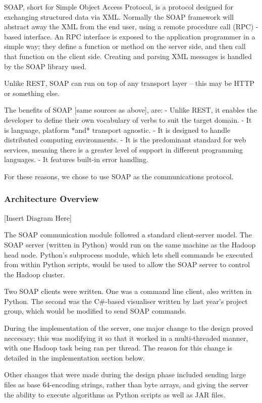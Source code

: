 SOAP, short for Simple Object Access Protocol, is a protocol designed for exchanging structured data via XML. Normally the SOAP framework will abstract away the XML from the end user, using a remote procedure call (RPC) -based interface. An RPC interface is exposed to the application programmer in a simple way; they define a function or method on the server side, and then call that function on the client side. Creating and parsing XML messages is handled by the SOAP library used.

Unlike REST, SOAP can run on top of any transport layer -- this may be HTTP or something else.

The benefits of SOAP [same sources as above], are:
- Unlike REST, it enables the developer to define their own vocabulary of verbs to suit the target domain.
- It is language, platform *and* transport agnostic.
- It is designed to handle distributed computing environments.
- It is the predominant standard for web services, meaning there is a greater level of support in different programming languages.
- It features built-in error handling.

For these reasons, we chose to use SOAP as the communications protocol.

\subsubsection{Architecture Overview}

[Insert Diagram Here]

The SOAP communication module followed a standard client-server model. The SOAP server (written in Python) would run on the same machine as the Hadoop head node. Python's subprocess module, which lets shell commands be executed from within Python scripts, would be used to allow the SOAP server to control the Hadoop cluster.

Two SOAP clients were written. One was a command line client, also written in Python. The second was the C#-based visualiser written by last year's project group, which would be modified to send SOAP commands.

During the implementation of the server, one major change to the design proved neccesary; this was modifying it so that it worked in a multi-threaded manner, with one Hadoop task being ran per thread. The reason for this change is detailed in the implementation section below.

Other changes that were made during the design phase included sending large files as base 64-encoding strings, rather than byte arrays, and giving the server the ability to execute algorithms as Python scripts as well as JAR files.

